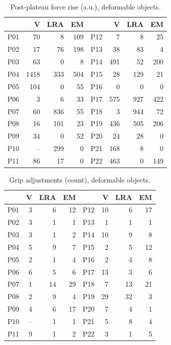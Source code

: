 \documentclass[12pt, a4paper, twoside, openright]{report}
\begin{document}
\begin{table}[ht]
    \centering
    \small
    \caption{Post-plateau force rise (a.u.), deformable objects.}
    \label{tab:appB-def-excess}
    \begin{tabular}{@{}lrrr@{\hspace{2em}}lrrr@{}}
        \toprule
            & V    & LRA & EM  &     & V   & LRA & EM  \\
        \midrule
        P01 & 70   & 8   & 109 & P12 & 7   & 8   & 25  \\
        P02 & 17   & 76  & 198 & P13 & 38  & 83  & 4   \\
        P03 & 63   & 0   & 8   & P14 & 491 & 52  & 200 \\
        P04 & 1418 & 333 & 504 & P15 & 28  & 129 & 21  \\
        P05 & 104  & 0   & 55  & P16 & 0   & 0   & 0   \\
        P06 & 3    & 6   & 33  & P17 & 575 & 927 & 422 \\
        P07 & 60   & 836 & 55  & P18 & 3   & 944 & 72  \\
        P08 & 16   & 101 & 23  & P19 & 436 & 505 & 206 \\
        P09 & 34   & 0   & 52  & P20 & 24  & 28  & 0   \\
        P10 & --   & 299 & 0   & P21 & 168 & 8   & 0   \\
        P11 & 86   & 17  & 0   & P22 & 463 & 0   & 149 \\
        \bottomrule
    \end{tabular}
\end{table}

\begin{table}[ht]
    \centering
    \small
    \caption{Grip adjustments (count), deformable objects.}
    \label{tab:appB-def-adj}
    \begin{tabular}{@{}lrrr@{\hspace{2em}}lrrr@{}}
        \toprule
            & V  & LRA & EM &     & V  & LRA & EM \\
        \midrule
        P01 & 3  & 6   & 12 & P12 & 10 & 6   & 17 \\
        P02 & 3  & 1   & 1  & P13 & 1  & 1   & 1  \\
        P03 & 3  & 1   & 2  & P14 & 10 & 9   & 8  \\
        P04 & 5  & 9   & 7  & P15 & 2  & 5   & 12 \\
        P05 & 2  & 1   & 4  & P16 & 2  & 4   & 8  \\
        P06 & 6  & 5   & 6  & P17 & 13 & 3   & 6  \\
        P07 & 1  & 14  & 29 & P18 & 7  & 13  & 21 \\
        P08 & 2  & 9   & 4  & P19 & 29 & 32  & 3  \\
        P09 & 4  & 6   & 17 & P20 & 7  & 4   & 1  \\
        P10 & -- & 1   & 1  & P21 & 5  & 8   & 4  \\
        P11 & 9  & 1   & 2  & P22 & 3  & 1   & 5  \\
        \bottomrule
    \end{tabular}
\end{table}
\end{document}

